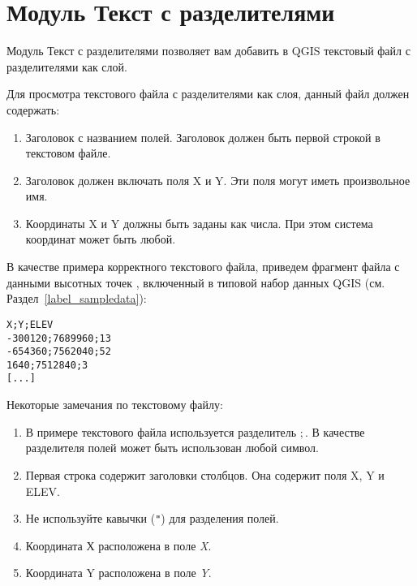 
\section{Модуль Текст с разделителями}\label{label_dltext}


Модуль Текст с разделителями позволяет вам добавить в QGIS текстовый файл
с разделителями как слой.


Для просмотра текстового файла с разделителями как слоя, данный файл должен
содержать:

\begin{enumerate}
\item Заголовок с названием полей. Заголовок должен быть первой строкой
в текстовом файле.
\item Заголовок должен включать поля X и Y. Эти поля могут иметь произвольное имя.
\item Координаты X и Y должны быть заданы как числа. При этом система
координат может быть любой.
\end{enumerate}

В качестве примера корректного текстового файла, приведем фрагмент файла
с данными высотных точек , включенный в типовой набор
данных QGIS (см. Раздел~\ref{label_sampledata}):

\begin{verbatim}
X;Y;ELEV
-300120;7689960;13
-654360;7562040;52
1640;7512840;3
[...]
\end{verbatim}

Некоторые замечания по текстовому файлу:

\begin{enumerate}
\item В примере текстового файла используется разделитель \mbox{$;$}. В
качестве разделителя полей может быть использован любой символ.
\item Первая строка содержит заголовки столбцов. Она содержит поля X, Y и ELEV.
\item Не используйте кавычки ({\tt{}"{}}) для разделения полей.
\item Координата Х расположена в поле {\em X}.
\item Координата Y расположена в поле {\em Y}.
\end{enumerate}

